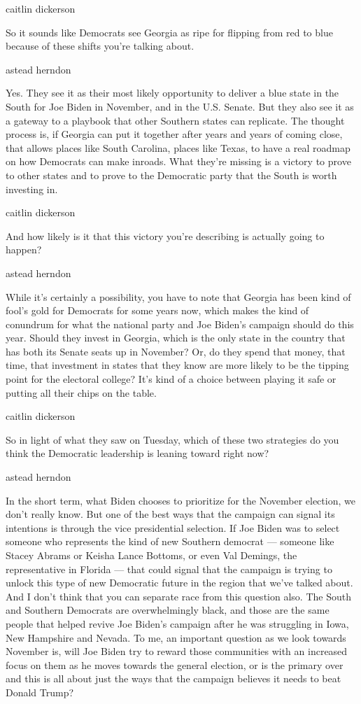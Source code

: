caitlin dickerson

So it sounds like Democrats see Georgia as ripe for flipping from red to
blue because of these shifts you're talking about.

astead herndon

Yes. They see it as their most likely opportunity to deliver a blue
state in the South for Joe Biden in November, and in the U.S. Senate.
But they also see it as a gateway to a playbook that other Southern
states can replicate. The thought process is, if Georgia can put it
together after years and years of coming close, that allows places like
South Carolina, places like Texas, to have a real roadmap on how
Democrats can make inroads. What they're missing is a victory to prove
to other states and to prove to the Democratic party that the South is
worth investing in.

caitlin dickerson

And how likely is it that this victory you're describing is actually
going to happen?

astead herndon

While it's certainly a possibility, you have to note that Georgia has
been kind of fool's gold for Democrats for some years now, which makes
the kind of conundrum for what the national party and Joe Biden's
campaign should do this year. Should they invest in Georgia, which is
the only state in the country that has both its Senate seats up in
November? Or, do they spend that money, that time, that investment in
states that they know are more likely to be the tipping point for the
electoral college? It's kind of a choice between playing it safe or
putting all their chips on the table.

caitlin dickerson

So in light of what they saw on Tuesday, which of these two strategies
do you think the Democratic leadership is leaning toward right now?

astead herndon

In the short term, what Biden chooses to prioritize for the November
election, we don't really know. But one of the best ways that the
campaign can signal its intentions is through the vice presidential
selection. If Joe Biden was to select someone who represents the kind of
new Southern democrat --- someone like Stacey Abrams or Keisha Lance
Bottoms, or even Val Demings, the representative in Florida --- that
could signal that the campaign is trying to unlock this type of new
Democratic future in the region that we've talked about. And I don't
think that you can separate race from this question also. The South and
Southern Democrats are overwhelmingly black, and those are the same
people that helped revive Joe Biden's campaign after he was struggling
in Iowa, New Hampshire and Nevada. To me, an important question as we
look towards November is, will Joe Biden try to reward those communities
with an increased focus on them as he moves towards the general
election, or is the primary over and this is all about just the ways
that the campaign believes it needs to beat Donald Trump?

